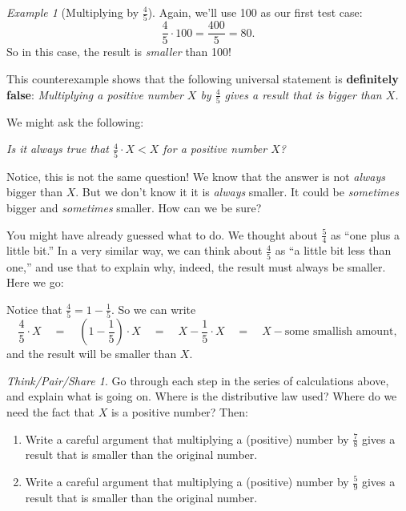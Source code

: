 \documentclass[10pt, reqno]{amsart}
\theoremstyle{remark}
\newtheorem{example}[thm]{Example}
\newtheorem*{thinkpair*}{Think/Pair/Share}
\theoremstyle{definition}
\numberwithin{equation}{section}  %
\begin{document}
\begin{example}[Multiplying by $\frac 4 5$]
  Again, we'll use 100 as our first test case:
\[
\frac 4 5 \cdot 100 = \frac{400} 5 = 80.
\]
So in this case, the result is \emph{smaller} than 100!  
\end{example}

This counterexample shows that the following  universal statement is {\bf definitely false}:
\emph{Multiplying a positive number $X$ by $\frac 4 5$ gives a result that is bigger than $X$.}


We might ask the following:
\begin{center}
\emph{Is it always true that  $\frac 4 5 \cdot X < X$ for a positive number $X$?}
\end{center}

Notice, this is not the same question!  We know that the answer is not \emph{always} bigger than $X$.  But we don't know it it is \emph{always} smaller.  It could be \emph{sometimes} bigger and \emph{sometimes} smaller.  How can we be sure?

You might have already guessed what to do.  We thought about $\frac 5 4$ as ``one plus a little bit.''  In a very similar way, we can think about $\frac 4 5$ as ``a little bit less than one,'' and use that to explain why, indeed, the result must always be smaller.  Here we go:

Notice that $\frac 4 5 = 1 - \frac 1 5$.  So we can write
\[
\frac 4 5 \cdot X 
\quad
=
\quad
\left( 1 - \frac 1 5\right) \cdot X
\quad 
=
\quad
X - \frac 1 5\cdot X
\quad
=
\quad
X - \text{some smallish amount},
\]
and the result will be smaller than $X$.

\begin{thinkpair*}
Go through each step in the series of calculations above, and explain what is going on.  Where is the distributive law used?  Where do we need the fact that $X$ is a positive number?  Then:
\begin{enumerate}
\item
Write a careful argument that multiplying a (positive) number by $\frac 7 8$ gives a result that is smaller than the original number.\\
\item
 Write a careful argument that multiplying a (positive) number by $\frac 5 9$ gives a result that is smaller than the original number.\\
 \end{enumerate}

\end{thinkpair*}
\end{document}
